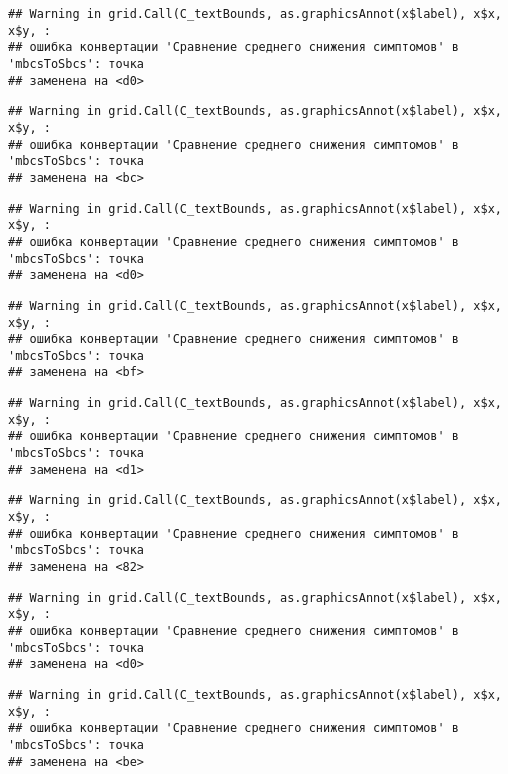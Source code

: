 \documentclass[
]{article}
\begin{document}
\begin{verbatim}
## Warning in grid.Call(C_textBounds, as.graphicsAnnot(x$label), x$x, x$y, :
## ошибка конвертации 'Сравнение среднего снижения симптомов' в 'mbcsToSbcs': точка
## заменена на <d0>
\end{verbatim}

\begin{verbatim}
## Warning in grid.Call(C_textBounds, as.graphicsAnnot(x$label), x$x, x$y, :
## ошибка конвертации 'Сравнение среднего снижения симптомов' в 'mbcsToSbcs': точка
## заменена на <bc>
\end{verbatim}

\begin{verbatim}
## Warning in grid.Call(C_textBounds, as.graphicsAnnot(x$label), x$x, x$y, :
## ошибка конвертации 'Сравнение среднего снижения симптомов' в 'mbcsToSbcs': точка
## заменена на <d0>
\end{verbatim}

\begin{verbatim}
## Warning in grid.Call(C_textBounds, as.graphicsAnnot(x$label), x$x, x$y, :
## ошибка конвертации 'Сравнение среднего снижения симптомов' в 'mbcsToSbcs': точка
## заменена на <bf>
\end{verbatim}

\begin{verbatim}
## Warning in grid.Call(C_textBounds, as.graphicsAnnot(x$label), x$x, x$y, :
## ошибка конвертации 'Сравнение среднего снижения симптомов' в 'mbcsToSbcs': точка
## заменена на <d1>
\end{verbatim}

\begin{verbatim}
## Warning in grid.Call(C_textBounds, as.graphicsAnnot(x$label), x$x, x$y, :
## ошибка конвертации 'Сравнение среднего снижения симптомов' в 'mbcsToSbcs': точка
## заменена на <82>
\end{verbatim}

\begin{verbatim}
## Warning in grid.Call(C_textBounds, as.graphicsAnnot(x$label), x$x, x$y, :
## ошибка конвертации 'Сравнение среднего снижения симптомов' в 'mbcsToSbcs': точка
## заменена на <d0>
\end{verbatim}

\begin{verbatim}
## Warning in grid.Call(C_textBounds, as.graphicsAnnot(x$label), x$x, x$y, :
## ошибка конвертации 'Сравнение среднего снижения симптомов' в 'mbcsToSbcs': точка
## заменена на <be>
\end{verbatim}
\end{document}
